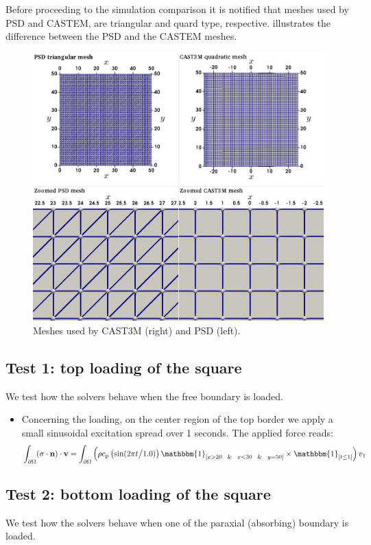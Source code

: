 Before proceeding to the simulation comparison it is notified that meshes used by PSD and CASTEM, are triangular and quard type, respective.  illustrates the difference between the PSD and the CASTEM meshes.

\begin{figure}[h]
	\centering
	\includegraphics[width=.8\textwidth]{./Images/mesh-CAST3M-PSD}
	\caption{Meshes used by CAST3M (right) and PSD (left).\label{fig:meshes} }
\end{figure}

\subsection{Test 1: top loading of the square}
We test how the solvers behave when the free boundary is loaded. 

\begin{itemize}
	\item Concerning the loading, on the center region of the top border we apply a small sinusoidal excitation spread over 1  seconds. The applied force reads:
	$$\int_{\partial \Omega} (\sigma\cdot\textbf{n})\cdot\bv  = \int_{\partial \Omega} \left(\rho c_{\text{p}}\left( \sin(2\pi t\big /1.0)\right)\mathbbm{1}_{[x>20~~\&~~x<30~~\&~~y=50  ]}\times\mathbbm{1}_{[t\le1]}\right)v_1$$
	
		 	
\end{itemize}



\subsection{Test 2: bottom loading of the square}
We test how the solvers behave when one of the paraxial (absorbing) boundary is loaded. 

